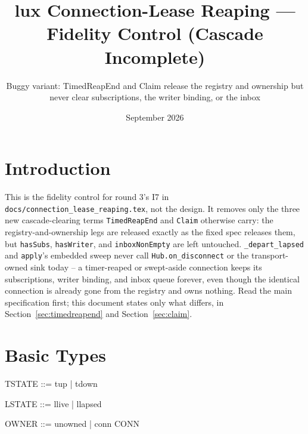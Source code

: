 \documentclass[a4paper,10pt,fleqn]{article}
\begin{document}
\title{lux Connection-Lease Reaping --- Fidelity Control (Cascade Incomplete)}
\author{Buggy variant: TimedReapEnd and Claim release the registry and
  ownership but never clear subscriptions, the writer binding, or the
  inbox}
\date{September 2026}
\maketitle

\section{Introduction}

This is the fidelity control for round 3's I7 in
\texttt{docs/connection\_lease\_reaping.tex}, not the design. It removes
only the three new cascade-clearing terms \texttt{TimedReapEnd} and
\texttt{Claim} otherwise carry: the registry-and-ownership legs are
released exactly as the fixed spec releases them, but \texttt{hasSubs},
\texttt{hasWriter}, and \texttt{inboxNonEmpty} are left untouched.
\texttt{\_depart\_lapsed} and \texttt{apply}'s embedded sweep never call
\texttt{Hub.on\_disconnect} or the transport-owned sink today -- a
timer-reaped or swept-aside connection keeps its subscriptions, writer
binding, and inbox queue forever, even though the identical connection is
already gone from the registry and owns nothing. Read the main
specification first; this document states only what differs, in
Section~\ref{sec:timedreapend} and Section~\ref{sec:claim}.

\section{Basic Types}

\begin{zed}
\end{zed}

\begin{zed}
  TSTATE ::= tup | tdown
\end{zed}

\begin{zed}
  LSTATE ::= llive | llapsed
\end{zed}

\begin{zed}
  OWNER ::= unowned | conn \ldata CONN \rdata
\end{zed}
\end{document}

